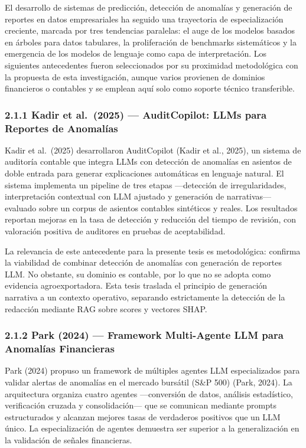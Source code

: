 El desarrollo de sistemas de predicción, detección de anomalías y
generación de reportes en datos empresariales ha seguido una trayectoria
de especialización creciente, marcada por tres tendencias paralelas: el
auge de los modelos basados en árboles para datos tabulares, la
proliferación de benchmarks sistemáticos y la emergencia de los modelos
de lenguaje como capa de interpretación. Los siguientes antecedentes
fueron seleccionados por su proximidad metodológica con la propuesta de
esta investigación, aunque varios provienen de dominios financieros o
contables y se emplean aquí solo como soporte técnico transferible.

\subsubsection{2.1.1 Kadir et al.~(2025) --- AuditCopilot: LLMs para
Reportes de
Anomalías}\label{kadir-et-al.-2025-auditcopilot-llms-para-reportes-de-anomaluxedas}

Kadir et al.~(2025) desarrollaron AuditCopilot (Kadir et al., 2025), un
sistema de auditoría contable que integra LLMs con detección de
anomalías en asientos de doble entrada para generar explicaciones
automáticas en lenguaje natural. El sistema implementa un pipeline de
tres etapas ---detección de irregularidades, interpretación contextual
con LLM ajustado y generación de narrativas--- evaluado sobre un corpus
de asientos contables sintéticos y reales. Los resultados reportan
mejoras en la tasa de detección y reducción del tiempo de revisión, con
valoración positiva de auditores en pruebas de aceptabilidad.

La relevancia de este antecedente para la presente tesis es
metodológica: confirma la viabilidad de combinar detección de anomalías
con generación de reportes LLM. No obstante, su dominio es contable, por
lo que no se adopta como evidencia agroexportadora. Esta tesis traslada
el principio de generación narrativa a un contexto operativo, separando
estrictamente la detección de la redacción mediante RAG sobre scores y
vectores SHAP.

\subsubsection{2.1.2 Park (2024) --- Framework Multi-Agente LLM para
Anomalías
Financieras}\label{park-2024-framework-multi-agente-llm-para-anomaluxedas-financieras}

Park (2024) propuso un framework de múltiples agentes LLM especializados
para validar alertas de anomalías en el mercado bursátil (S\&P 500)
(Park, 2024). La arquitectura organiza cuatro agentes ---conversión de
datos, análisis estadístico, verificación cruzada y consolidación--- que
se comunican mediante prompts estructurados y alcanzan mejores tasas de
verdaderos positivos que un LLM único. La especialización de agentes
demuestra ser superior a la generalización en la validación de señales
financieras.

